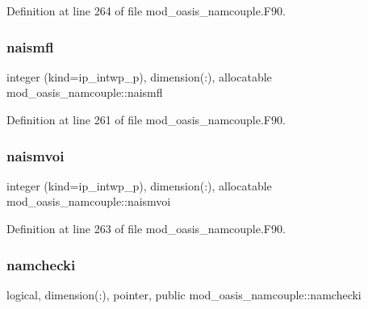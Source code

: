 Definition at line 264 of file mod\+\_\+oasis\+\_\+namcouple.\+F90.

\mbox{\label{namespacemod__oasis__namcouple_a4a7cad8814c7811b364fd7d70b60b576}} 
\subsubsection{\texorpdfstring{naismfl}{naismfl}}
{\footnotesize\ttfamily integer (kind=ip\+\_\+intwp\+\_\+p), dimension(\+:), allocatable mod\+\_\+oasis\+\_\+namcouple\+::naismfl\hspace{0.3cm}{\ttfamily [private]}}



Definition at line 261 of file mod\+\_\+oasis\+\_\+namcouple.\+F90.

\mbox{\label{namespacemod__oasis__namcouple_ae3d7c72b2f2f3ece9583cc0b25edbaba}} 
\subsubsection{\texorpdfstring{naismvoi}{naismvoi}}
{\footnotesize\ttfamily integer (kind=ip\+\_\+intwp\+\_\+p), dimension(\+:), allocatable mod\+\_\+oasis\+\_\+namcouple\+::naismvoi\hspace{0.3cm}{\ttfamily [private]}}



Definition at line 263 of file mod\+\_\+oasis\+\_\+namcouple.\+F90.

\mbox{\label{namespacemod__oasis__namcouple_a7c88a329c97aea020e9b135bdca8d160}} 
\subsubsection{\texorpdfstring{namchecki}{namchecki}}
{\footnotesize\ttfamily logical, dimension(\+:), pointer, public mod\+\_\+oasis\+\_\+namcouple\+::namchecki}



